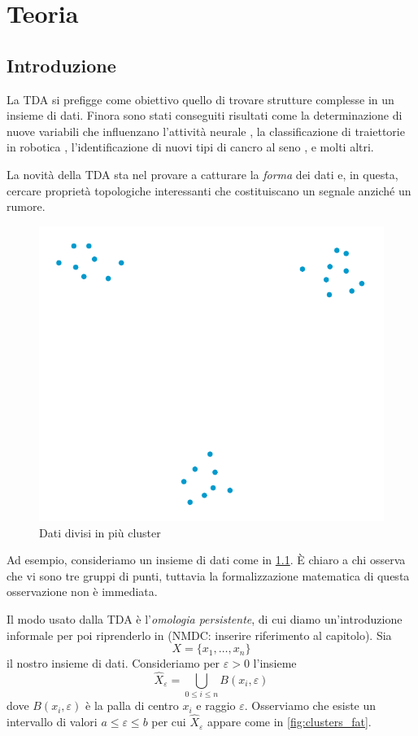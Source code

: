 \chapter{Teoria}\label{ch:teoria}
\section{Introduzione}

La TDA si prefigge come obiettivo quello di trovare strutture complesse in un insieme di dati. Finora sono stati conseguiti risultati come la determinazione di nuove variabili che influenzano l'attività neurale \cite{Spreemann2015}, la classificazione di traiettorie in robotica \cite{Pokorny2014}, l'identificazione di nuovi tipi di cancro al seno \cite{Lum2013}, e molti altri.

La novità della TDA sta nel provare a catturare la \emph{forma} dei dati e, in questa, cercare proprietà topologiche interessanti che costituiscano un segnale anziché un rumore.

\begin{figure}[h]
  \begin{center}
    \includegraphics[width=.4\linewidth]{gfx/three_clusters_small.pdf}
    \caption{Dati divisi in più cluster}
    \label{fig:clusters}
  \end{center}
\end{figure}

Ad esempio, consideriamo un insieme di dati come in \cref{fig:clusters}. È chiaro a chi osserva che vi sono tre gruppi di punti, tuttavia la formalizzazione matematica di questa osservazione non è immediata.

Il modo usato dalla TDA è l'\emph{omologia persistente}, di cui diamo un'introduzione informale per poi riprenderlo in (NMDC: inserire riferimento al capitolo). Sia
\begin{equation*}
  X=\{x_1,\dots, x_n\}
\end{equation*}
il nostro insieme di dati. Consideriamo per $\varepsilon>0$ l'insieme
\begin{equation*}
  \widehat{X}_\varepsilon=\bigcup_{0\leq i\leq n} B(x_i,\varepsilon)
\end{equation*}
dove $B(x_i,\varepsilon)$ è la palla di centro $x_i$ e raggio $\varepsilon$. Osserviamo che esiste un intervallo di valori $a \leq \varepsilon \leq b$ per cui $\widehat{X}_\varepsilon$ appare come in \cref{fig:clusters_fat}.

